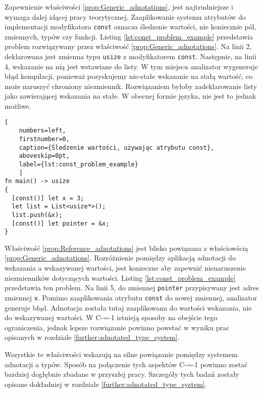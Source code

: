 Zapewnienie właściwości \ref{prop:Generic_adnotations}, jest najtrudniejsze i wymaga dalej idącej pracy teorytycznej.
Zaaplikowanie systemu atrybutów do implementacji modyfikatora \lstinline{const} oznacza śledzenie wartości, nie koniecznie pól, zmiennych, typów czy funkcji.
Listing \ref{lst:const_problem_example} przedstawia problem rozwiązywany przez właściwość \ref{prop:Generic_adnotations}.
Na linii 2, deklarowana jest zmienna typu \lstinline{usize} z modyfikatorem \lstinline{const}.
Następnie, na linii 4, wskazanie na nią jest wstawiane do listy.
W tym miejscu analizator wygeneruje błąd kompilacji, ponieważ pozyskujemy nie-stałe wskazanie na stałą wartość, co może naruszyć chroniony niezmiennik.
Rozwiązaniem byłoby zadeklarowanie listy jako zawierającej wskazania na stałe.
W obecnej formie języka, nie jest to jednak możliwe.

\begin{minipage}{\linewidth}
  
  \begin{lstlisting}[
    numbers=left,
    firstnumber=0,
    caption={Śledzenie wartości, używając atrybutu const},
    aboveskip=0pt,
    label={lst:const_problem_example}
    ]
fn main() -> usize
{
  [const()] let x = 3;
  let list = List<usize*>();
  list.push(&x);
  [const()] let pointer = &x;
}
\end{lstlisting}
\end{minipage}


Właściwość \ref{prop:Reference_adnotations} jest blisko powiązana z właściowścią \ref{prop:Generic_adnotations}.
Rozróżnienie pomiędzy aplikacją adnotacji do wskazania a wskazywanej wartości, jest konieczne aby zapewnić nienaruszenie niezmienników dotyczących wartości.
Listing \ref{lst:const_problem_example} przedstawia ten problem.
Na linii 5, do zmiennej \lstinline{pointer} przypisywany jest adres zmiennej \lstinline{x}.
Pomimo zaaplikowania atrybutu \lstinline{const} do nowej zmiennej, analizator generuje błąd.
Adnotacja została tutaj zaaplikowana do wartości wskazania, nie do wskazywanej wartości.
W C-=-1 istnieją sposoby na obejście tego ograniczenia, jednak lepsze rozwiązanie powinno powstać w wyniku prac opisanych w rozdziale \ref{further:adnotated_type_system}.%

Wszystkie te właściwości wskazują na silne powiązanie pomiędzy systemem adnotacji a typów.
Sposób na połączenie tych aspektów C-=-1 powinno zostać bardziej dogłębnie zbadane w przyszłej pracy.
Szczegóły tych badań zostały opisane dokładniej w rozdziale \ref{further:adnotated_type_system}.


